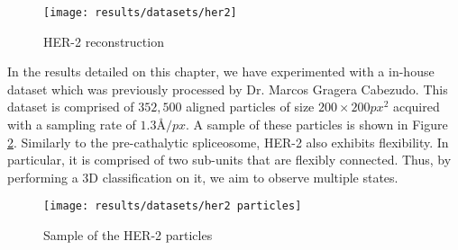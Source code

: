 \documentclass[../main.tex]{subfiles}
\begin{document}
\begin{figure}[htbp]
    \centering
    \texttt{[image: results/datasets/her2]}
    \caption{HER-2 reconstruction}
    \label{fig:5.1:her2}
\end{figure}

In the results detailed on this chapter, we have experimented with a in-house dataset which was previously processed by Dr. Marcos Gragera Cabezudo. This dataset is comprised of $352,500$ aligned particles of size $200 \times 200 \si{px^2}$ acquired with a sampling rate of $1.3 \si{\angstrom/px}$. A sample of these particles is shown in Figure \ref{fig:5.1:her2_particles}. Similarly to the pre-cathalytic spliceosome, HER-2 also exhibits flexibility. In particular, it is comprised of two sub-units that are flexibly connected. Thus, by performing a 3D classification on it, we aim to observe multiple states.

\begin{figure}[htbp]
    \centering
    \texttt{[image: results/datasets/her2 particles]}
    \caption{Sample of the HER-2 particles}
    \label{fig:5.1:her2_particles}
\end{figure}
\end{document}
